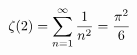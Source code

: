 \documentclass[preview]{standalone}
\begin{document}
\begin{align*}
\special{dvisvgm:raw <g id='unique000'>}\zeta(2)=\displaystyle\sum_{n=1}^{\infty}\dfrac{1}{n^2}=\dfrac{\pi^2}{6}\special{dvisvgm:raw </g>}
\end{align*}
\end{document}
